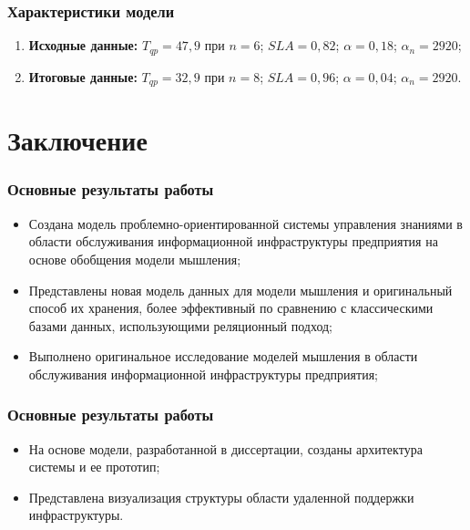 \documentclass[14pt]{beamer}
\begin{document}
\begin{frame}
\frametitle{Характеристики модели}
\begin{enumerate}
 \item \textbf{Исходные данные:} $T_{qp}=47,9$ при $n=6$; $SLA=0,82$; $\alpha=0,18$;  $\alpha_n=2920$;
 \item \textbf{Итоговые данные:} $T_{qp}=32,9$ при $n=8$; $SLA=0,96$; $\alpha=0,04$;  $\alpha_n=2920$.
\end{enumerate}
\end{frame}


%
%
\section[Заключение]{Заключение}



\begin{frame}
\frametitle{Основные результаты работы}
\begin{itemize}
   \item Создана модель проблемно-ориентированной системы управления знаниями в области обслуживания информационной инфраструктуры предприятия на основе обобщения модели мышления;
  \item Представлены новая модель данных для модели мышления и оригинальный способ их хранения, более эффективный по сравнению с классическими базами данных, использующими реляционный подход;
  \item  Выполнено оригинальное исследование моделей мышления в области обслуживания информационной инфраструктуры предприятия;
  
\end{itemize}
\end{frame}


\begin{frame}
\frametitle{Основные результаты работы}
\begin{itemize}
   \item На основе модели, разработанной в диссертации, созданы архитектура системы и ее прототип; 
   \item Представлена визуализация структуры области удаленной поддержки инфраструктуры.
\end{itemize}
\end{frame}
\end{document}
